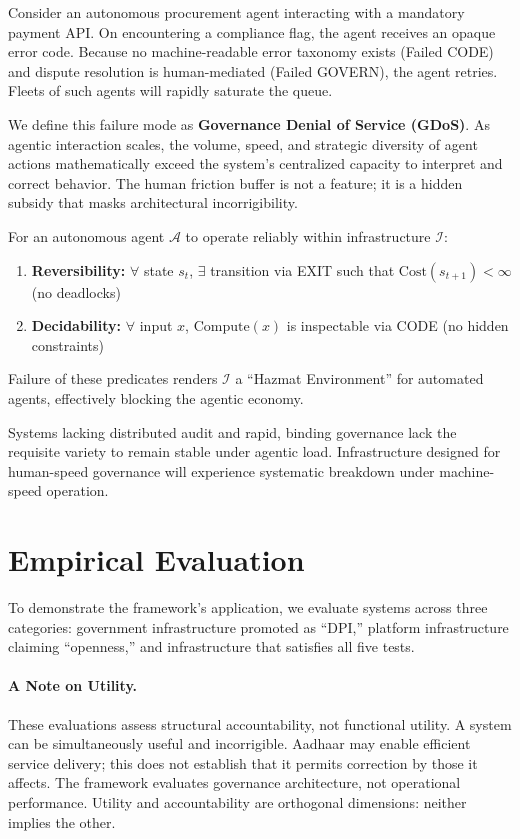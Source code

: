 Consider an autonomous procurement agent interacting with a mandatory payment API. On encountering a compliance flag, the agent receives an opaque error code. Because no machine-readable error taxonomy exists (Failed CODE) and dispute resolution is human-mediated (Failed GOVERN), the agent retries. Fleets of such agents will rapidly saturate the queue.

We define this failure mode as \textbf{Governance Denial of Service (GDoS)}. As agentic interaction scales, the volume, speed, and strategic diversity of agent actions mathematically exceed the system's centralized capacity to interpret and correct behavior. The human friction buffer is not a feature; it is a hidden subsidy that masks architectural incorrigibility.

\begin{condition}
For an autonomous agent $\mathcal{A}$ to operate reliably within infrastructure $\mathcal{I}$:
\begin{enumerate}[noitemsep]
    \item \textbf{Reversibility:} $\forall$ state $s_t$, $\exists$ transition via EXIT such that $\text{Cost}(s_{t+1}) < \infty$ (no deadlocks)
    \item \textbf{Decidability:} $\forall$ input $x$, $\text{Compute}(x)$ is inspectable via CODE (no hidden constraints)
\end{enumerate}
Failure of these predicates renders $\mathcal{I}$ a ``Hazmat Environment'' for automated agents, effectively blocking the agentic economy.
\end{condition}

Systems lacking distributed audit and rapid, binding governance lack the requisite variety to remain stable under agentic load. Infrastructure designed for human-speed governance will experience systematic breakdown under machine-speed operation.

\section{Empirical Evaluation}
\label{sec:diagnosis}

To demonstrate the framework's application, we evaluate systems across three categories: government infrastructure promoted as ``DPI,'' platform infrastructure claiming ``openness,'' and infrastructure that satisfies all five tests.

\paragraph{A Note on Utility.} These evaluations assess structural accountability, not functional utility. A system can be simultaneously useful and incorrigible. Aadhaar may enable efficient service delivery; this does not establish that it permits correction by those it affects. The framework evaluates governance architecture, not operational performance. Utility and accountability are orthogonal dimensions: neither implies the other.

